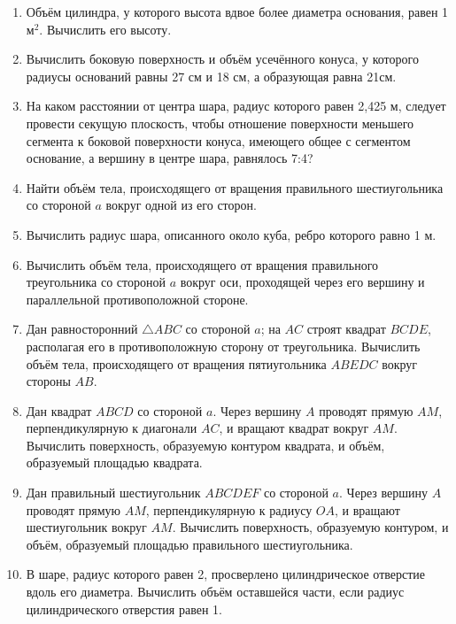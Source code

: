 \begin{enumerate}

\item 
Объём цилиндра, у которого высота вдвое более диаметра основания, равен 1 м$^2$.
Вычислить его высоту.

\item
Вычислить боковую поверхность и объём усечённого конуса, у которого радиусы оснований равны 27 см и 18 см, а образующая равна 21см.

\item
На каком расстоянии от центра шара, радиус которого равен 2,425 м, следует провести секущую плоскость, чтобы отношение поверхности меньшего сегмента к боковой поверхности конуса, имеющего общее с сегментом основание, а вершину в центре шара, равнялось 7:4?

\item
Найти объём тела, происходящего от вращения правильного шестиугольника со стороной $a$ вокруг одной из его сторон.

\item
Вычислить радиус шара, описанного около куба, ребро которого равно 1 м.

\item
Вычислить объём тела, происходящего от вращения правильного треугольника со стороной $a$ вокруг оси, проходящей через его вершину и параллельной противоположной стороне.

\item
Дан равносторонний $\triangle ABC$ со стороной $a$;
на $AC$ строят квадрат $BCDE$, располагая его в противоположную сторону от треугольника.
Вычислить объём тела, происходящего от вращения пятиугольника $ABEDC$ вокруг стороны $AB$.

\item
Дан квадрат $ABCD$ со стороной $a$.
Через вершину $A$ проводят прямую $AM$, перпендикулярную к диагонали $AC$, и вращают квадрат вокруг $AM$.
Вычислить поверхность, образуемую контуром квадрата, и объём, образуемый площадью квадрата.

\item
Дан правильный шестиугольник $ABCDEF$ со стороной $a$.
Через вершину $A$ проводят прямую $AM$, перпендикулярную к радиусу $OA$, и вращают шестиугольник вокруг $AM$.
Вычислить поверхность, образуемую контуром, и объём, образуемый площадью правильного шестиугольника.

\item
В шаре, радиус которого равен 2, просверлено цилиндрическое отверстие вдоль его диаметра.
Вычислить объём оставшейся части, если радиус цилиндрического отверстия равен 1.


\end{enumerate}
